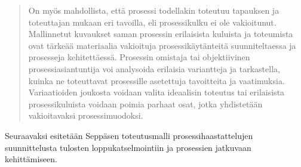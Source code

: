 \documentclass[
  finnish,
  letterpaper,
  DIV=11,
  numbers=noendperiod,
  oneside]{scrreprt}
\begin{document}
\begin{quote}
On myös mahdollista, että prosessi todellakin toteutuu tapauksen ja
toteuttajan mukaan eri tavoilla, eli prosessikulku ei ole vakioitunut.
Mallinnetut kuvaukset saman prosessin erilaisista kuluista ja toteumista
ovat tärkeää materiaalia vakioituja prosessikäytänteitä suunniteltaessa
ja prosesseja kehitettäessä. Prosessin omistaja tai objektiivinen
prosessiasiantuntija voi analysoida erilaisia variantteja ja
tarkastella, kuinka ne toteuttavat prosessille asetettuja tavoitteita ja
vaatimuksia. Variaatioiden joukosta voidaan valita ideaalisin toteutus
tai erilaisista prosessikuluista voidaan poimia parhaat osat, jotka
yhdistetään vakioitavaksi prosessimuodoksi.
\end{quote}

Seuraavaksi esitetään Seppäsen toteutusmalli prosessihaastattelujen
suunnittelusta tulosten loppukatselmointiin ja prosessien jatkuvaan
kehittämiseen.
\end{document}
